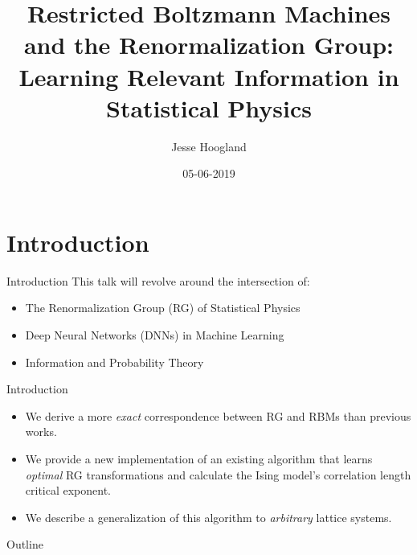 \documentclass{beamer}
\title[RBMs and RG\@: Learning Relevant Information]{Restricted Boltzmann Machines and the Renormalization Group: Learning Relevant Information in Statistical Physics}
\author{Jesse Hoogland}
\institute{Amsterdam University College}
\date{05-06-2019}
\begin{document}
\begin{frame}
  \titlepage
\end{frame}

\section{Introduction}
\begin{frame}{Introduction}
  This talk will revolve around the intersection of: {\Large
    \begin{itemize}
    \item The Renormalization Group (RG) of Statistical Physics
    \item Deep Neural Networks (DNNs) in Machine Learning
    \item Information and Probability Theory
    \end{itemize}
  }
\end{frame}

\begin{frame}{Introduction}
    \begin{itemize}
    \item We derive a more \textit{exact} correspondence between RG and
      RBMs than previous works.
    \item We provide a new implementation of an existing algorithm that learns
      \textit{optimal} RG transformations and calculate the Ising model's correlation length critical exponent.
    \item We describe a generalization of this algorithm to
      \textit{arbitrary} lattice systems.
    \end{itemize}
\end{frame}

\begin{frame}{Outline}

    {\small
      \tableofcontents
      }
\end{frame}

\end{document}
